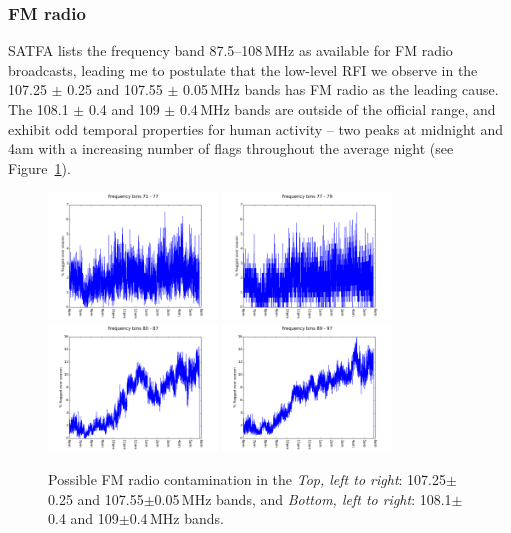 \documentclass[10pt,a4paper]{article}
\begin{document}
\subsubsection{FM radio}

SATFA lists the frequency band 87.5--108\,MHz as available for FM radio broadcasts, leading me to postulate that the low-level RFI we observe in the 107.25	$\pm$	0.25 and 107.55	$\pm$	0.05\,MHz bands has FM radio as the leading cause. The 108.1	$\pm$	0.4 and 109	$\pm$	0.4\,MHz bands are outside of the official range, and exhibit odd temporal properties for human activity -- two peaks at midnight and 4am with a increasing number of flags throughout the average night (see Figure~\ref{fig:FMradio}). 

\begin{figure}
\centering
\includegraphics[width=0.4\textwidth]{RFI-images/FB_71_77.png}
\includegraphics[width=0.4\textwidth]{RFI-images/FB_77_79.png}
\includegraphics[width=0.4\textwidth]{RFI-images/FB_80_87.png}
\includegraphics[width=0.4\textwidth]{RFI-images/FB_89_97.png}
\caption{Possible FM radio contamination in the \textit{Top, left to right}: 107.25$\pm$0.25 and 107.55$\pm$0.05\,MHz bands, and \textit{Bottom, left to right}: 108.1$\pm$0.4 and 109$\pm$0.4\,MHz bands.}
\label{fig:FMradio}
\end{figure}
\end{document}
